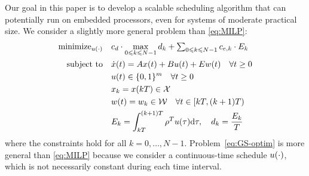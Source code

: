 Our goal in this paper is to develop a scalable %
scheduling algorithm that can potentially run on embedded processors, even for systems of moderate practical size.
We consider a slightly more general problem than \eqref{eq:MILP}:
\begin{align}
  \operatorname{minimize}_{u (\cdot)} \quad & c_d \cdot \max_{0 \leqslant k \leqslant
  N - 1} d_k + \textstyle\sum_{0 \leqslant k \leqslant N - 1} c_{e, k} \cdot E_k 
  \label{eq:GS-optim}\\
  \text{subject to} \quad
  & \dot{x} (t) = Ax (t) + Bu (t) + Ew (t) \quad \forall t \geq 0 \nonumber\\
  & u(t) \in \{0,1\}^{m} \quad \forall t \geq 0 \nonumber\\
  & x_{k} = x (kT) \in \mathcal{X} \nonumber\\
  & w (t) = w_{k} \in \mathcal{W} \quad \forall t \in [kT, (k + 1) T) \nonumber\\
  & E_k = \int_{kT}^{(k + 1) T} \rho^{T} u(\tau) \mathrm{d} \tau, \quad d_k = \frac{E_k}{T} \nonumber
\end{align}
where the constraints hold for all $k = 0, \ldots, N - 1$.
Problem~\eqref{eq:GS-optim} is more general than \eqref{eq:MILP} because we consider a
continuous-time schedule $u (\cdot)$, which is not necessarily constant
during each time interval.



